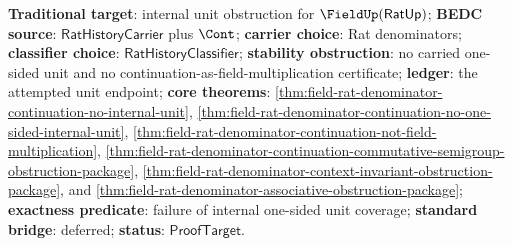 \textbf{Traditional target}: internal unit obstruction for
$\FieldUp(\mathsf{RatUp})$; \textbf{BEDC source}: $\mathsf{RatHistoryCarrier}$
plus $\Cont$; \textbf{carrier choice}: Rat denominators; \textbf{classifier
choice}: $\mathsf{RatHistoryClassifier}$; \textbf{stability obstruction}: no
carried one-sided unit and no continuation-as-field-multiplication certificate;
\textbf{ledger}: the attempted unit endpoint; \textbf{core theorems}:
\autoref{thm:field-rat-denominator-continuation-no-internal-unit},
\autoref{thm:field-rat-denominator-continuation-no-one-sided-internal-unit},
\autoref{thm:field-rat-denominator-continuation-not-field-multiplication},
\autoref{thm:field-rat-denominator-continuation-commutative-semigroup-obstruction-package},
\autoref{thm:field-rat-denominator-context-invariant-obstruction-package},
and
\autoref{thm:field-rat-denominator-associative-obstruction-package};
\textbf{exactness predicate}: failure of internal one-sided unit coverage;
\textbf{standard bridge}: deferred; \textbf{status}: $\mathsf{ProofTarget}$.
